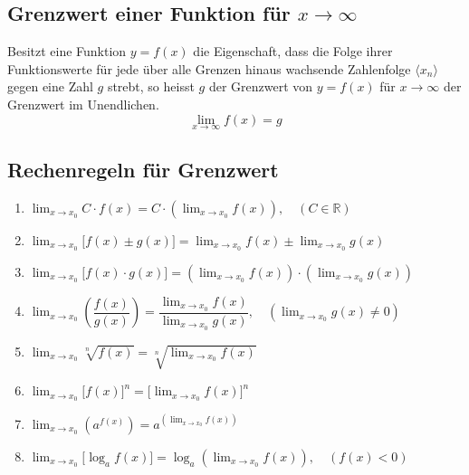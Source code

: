 \subsection{Grenzwert einer Funktion für $x\rightarrow \infty$}
Besitzt eine Funktion $y=f\left(x\right)$ die Eigenschaft, dass die Folge ihrer Funktionswerte für jede über alle Grenzen hinaus wachsende Zahlenfolge $\langle x_n\rangle$ gegen eine Zahl $g$ strebt, so heisst $g$ der Grenzwert von $y=f\left(x\right)$ für $x\rightarrow \infty$ der Grenzwert im Unendlichen.
\begin{equation} 
\boxed{\displaystyle \lim_{x\rightarrow \infty}f\left(x\right)=g}
\end{equation} 
\subsection{Rechenregeln für Grenzwert}
\begin{enumerate}[$(i)$]
\item $\displaystyle \lim_{x\rightarrow x_0}C\cdot f\left(x\right)=C\cdot \left(\displaystyle \lim_{x\rightarrow x_0}f\left(x\right)\right),\quad \left(C\in \mathbb{R}\right)$
\item $\displaystyle \lim_{x\rightarrow x_0}\Big[f\left(x\right)\pm g\left(x\right)\Big]=\displaystyle \lim_{x\rightarrow x_0}f\left(x\right)\pm \displaystyle \lim_{x\rightarrow x_0}g\left(x\right)$
\item $\displaystyle \lim_{x\rightarrow x_0}\Big[f\left(x\right)\cdot g\left(x\right)\Big]=\left(\displaystyle \lim_{x\rightarrow x_0}f\left(x\right)\right)\cdot \left(\displaystyle \lim_{x\rightarrow x_0}g\left(x\right)\right)$
\item $\displaystyle \lim_{x\rightarrow x_0}\left(\dfrac{f\left(x\right)}{g\left(x\right)}\right)=\dfrac{\displaystyle \lim_{x\rightarrow x_0}f\left(x\right)}{\displaystyle \lim_{x\rightarrow x_0}g\left(x\right)},\quad \left(\displaystyle \lim_{x\rightarrow x_0}g\left(x\right)\neq 0\right)$
\item $\displaystyle \lim_{x\rightarrow x_0}\sqrt[n]{f\left(x\right)}=\sqrt[n]{\displaystyle \lim_{x\rightarrow x_0}f\left(x\right)}$
\item $\displaystyle \lim_{x\rightarrow x_0}\Big[f\left(x\right)\Big]^n=\Big[\displaystyle \lim_{x\rightarrow x_0}f\left(x\right)\Big]^n$
\item $\displaystyle \lim_{x\rightarrow x_0}\left(a^{f\left(x\right)}\right)=a^{\left(\displaystyle \lim_{x\rightarrow x_0}f\left(x\right)\right)}$
\item $\displaystyle \lim_{x\rightarrow x_0}\Big[\log_a f\left(x\right)\Big]=\log_a \left(\displaystyle \lim_{x\rightarrow x_0}f\left(x\right)\right),\quad \left(f\left(x\right)<0\right)$
\end{enumerate}
